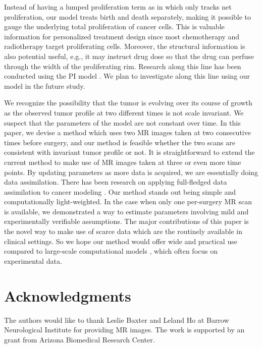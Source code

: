 \documentclass{aims}
\numberwithin{equation}{section}
\begin{document}
Instead of having a lumped proliferation term as in \cite{Jackson2015a}
which only tracks net proliferation, our model treats birth and death
separately, making it possible to gauge the underlying total proliferation
of cancer cells. This is valuable information for personalized treatment
design since most chemotherapy and radiotherapy target proliferating
cells. Moreover, the structural information is also potential useful,
e.g., it may instruct drug dose so that the drug can perfuse through
the width of the proliferating rim. Research along this line has been
conducted using the PI model \cite{Kim2017}. We plan to investigate
along this line using our model in the future study. 

We recognize the possibility that the tumor is evolving over its course
of growth as the observed tumor profile at two different times is
not scale invariant. We suspect that the parameters of the model are
not constant over time. In this paper, we devise a method which uses
two MR images taken at two consecutive times before surgery, and our
method is feasible whether the two scans are consistent with invariant
tumor profile or not. It is straightforward to extend the current
method to make use of MR images taken at three or even more time points.
By updating parameters as more data is acquired, we are essentially
doing data assimilation. There has been research on applying full-fledged
data assimilation to cancer modeling \cite{Kostelich2011,McDaniel2013}.
Our method stands out being simple and computationally light-weighted.
In the case when only one per-surgery MR scan is available, we demonstrated
a way to estimate parameters involving mild and experimentally verifiable
assumptions. The major contributions of this paper is the novel way
to make use of scarce data which are the routinely available in clinical
settings. So we hope our method would offer wide and practical use
compared to large-scale computational models \cite{Eikenberry2009,Rutter2017},
which often focus on experimental data. 



\section*{Acknowledgments}
The authors would like to thank Leslie Baxter and Leland Ho at Barrow
Neurological Institute for providing MR images. The work is supported
by an grant from Arizona Biomedical Research Center. \\
\end{document}
